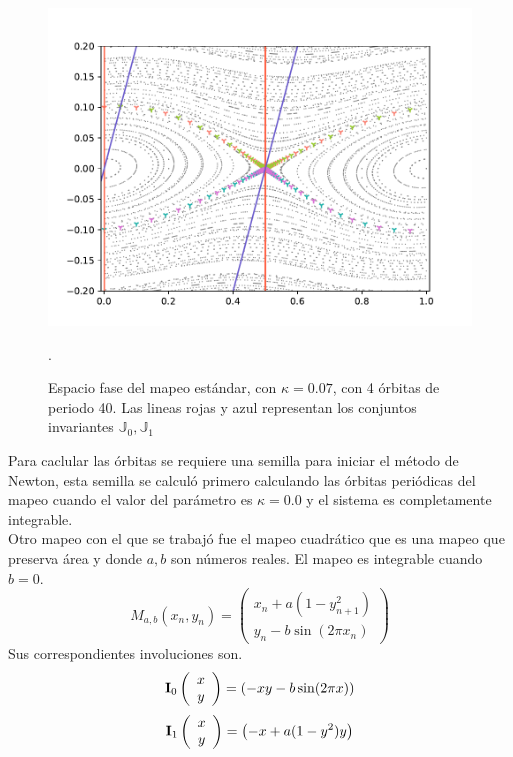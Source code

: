 \begin{figure}[H]
	\centering
	\includegraphics[scale= 0.7]{EstandarOP1-40.pdf}
	\label{orbitasp40estandar}
	\caption{Espacio fase del mapeo est\'andar, con $\kappa = 0.07$, con 4  \'orbitas de periodo 40. Las lineas rojas y azul representan los conjuntos invariantes $\mathbb{J}_{0},\mathbb{J}_{1}$}. 
\end{figure}

Para caclular las \'orbitas se requiere una semilla para iniciar el m\'etodo de Newton, esta semilla se calcul\'o primero calculando las \'orbitas peri\'odicas del mapeo cuando el valor del par\'ametro es $\kappa=0.0$ y el sistema es completamente integrable. \\ 

Otro mapeo con el que se trabaj\'o fue el mapeo cuadr\'atico que es una mapeo que preserva \'area y donde $a,b$ son n\'umeros reales. El mapeo es integrable cuando $b=0$.
\begin{equation}
	M_{a,b}(x_{n},y_{n}) = \left(
	\begin{array}{c}
	x_{n}+a(1-y_{n+1}^{2})\\
	y_{n}-b\sin(2\pi x_{n})
	\end{array}
	\right)
	\label{mapeocuadratico}
\end{equation}
Sus correspondientes involuciones son.
\begin{equation}
	\mathbf{I}_{0}
	\left(\begin{array}{c}
		x\\
		y
	\end{array}
	\right) = 
	\left(-x\\
	y-b\sin(2\pi x)
	\right)
	\label{involucioncuadratico0}
\end{equation}
\begin{equation}
	\mathbf{I}_{1}
	\left(\begin{array}{c}
		x\\
		y
	\end{array}
	\right) = 
	\left(-x+ a(1-y^{2})\\
	y
	\right)
	\label{involucioncuadratico1}
\end{equation}

